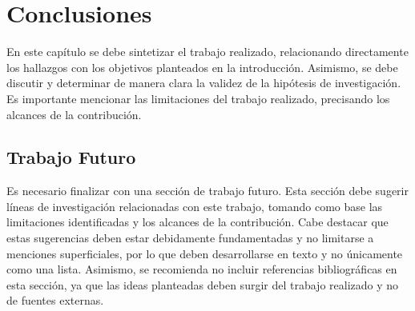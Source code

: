 \chapter{Conclusiones}\label{chap:conclusion}
En este capítulo se debe sintetizar el trabajo realizado, relacionando directamente los hallazgos con los objetivos planteados en la introducción. Asimismo, se debe discutir y determinar de manera clara la validez de la hipótesis de investigación. Es importante mencionar las limitaciones del trabajo realizado, precisando los alcances de la contribución.
\section{Trabajo Futuro}
Es necesario finalizar con una sección de trabajo futuro. Esta sección debe sugerir líneas de investigación relacionadas con este trabajo, tomando como base las limitaciones identificadas y los alcances de la contribución. Cabe destacar que estas sugerencias deben estar debidamente fundamentadas y no limitarse a menciones superficiales, por lo que deben desarrollarse en texto y no únicamente como una lista. Asimismo, se recomienda no incluir referencias bibliográficas en esta sección, ya que las ideas planteadas deben surgir del trabajo realizado y no de fuentes externas.